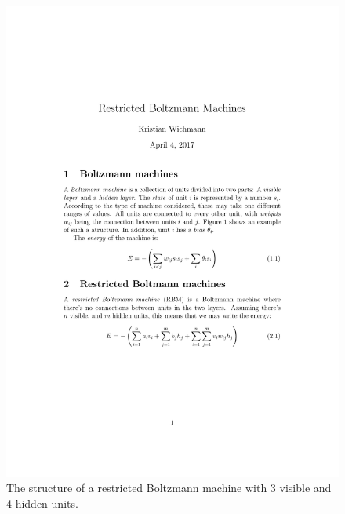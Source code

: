 \documentclass[12pt, a4paper]{article}
\numberwithin{equation}{section}
\begin{document}
\begin{figure}
\centering
\includegraphics{rbm}
\caption{The structure of a restricted Boltzmann machine with 3 visible and 4 hidden units.}
\label{fig:rbm}
\end{figure}
\end{document}
